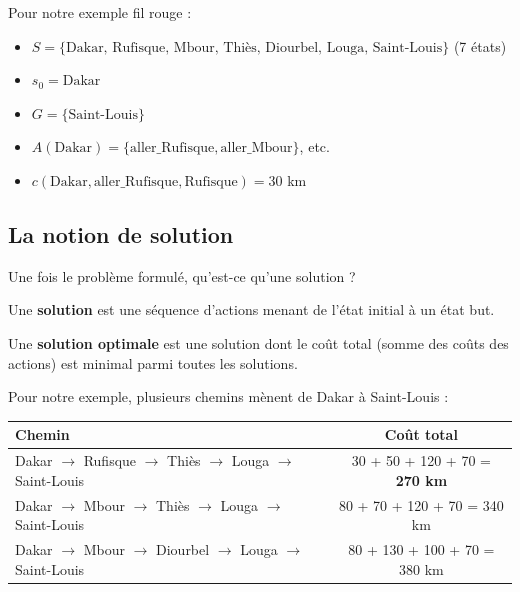 \documentclass[11pt,a4paper]{article}
\begin{document}
\begin{exemplebox}
Pour notre exemple fil rouge :
\begin{itemize}
    \item $S = \{\text{Dakar, Rufisque, Mbour, Thiès, Diourbel, Louga, Saint-Louis}\}$ (7 états)
    \item $s_0 = \text{Dakar}$
    \item $G = \{\text{Saint-Louis}\}$
    \item $A(\text{Dakar}) = \{\text{aller\_Rufisque}, \text{aller\_Mbour}\}$, etc.
    \item $c(\text{Dakar}, \text{aller\_Rufisque}, \text{Rufisque}) = 30$ km
\end{itemize}
\end{exemplebox}

\subsection{La notion de solution}

Une fois le problème formulé, qu'est-ce qu'une solution ?

\begin{definitionbox}
Une \textbf{solution} est une séquence d'actions menant de l'état initial à un état but.

Une \textbf{solution optimale} est une solution dont le coût total (somme des coûts des actions) est minimal parmi toutes les solutions.
\end{definitionbox}

Pour notre exemple, plusieurs chemins mènent de Dakar à Saint-Louis :

\begin{center}
\begin{tabular}{lc}
\toprule
\textbf{Chemin} & \textbf{Coût total} \\
\midrule
Dakar $\rightarrow$ Rufisque $\rightarrow$ Thiès $\rightarrow$ Louga $\rightarrow$ Saint-Louis & 30 + 50 + 120 + 70 = \textbf{270 km} \\
Dakar $\rightarrow$ Mbour $\rightarrow$ Thiès $\rightarrow$ Louga $\rightarrow$ Saint-Louis & 80 + 70 + 120 + 70 = 340 km \\
Dakar $\rightarrow$ Mbour $\rightarrow$ Diourbel $\rightarrow$ Louga $\rightarrow$ Saint-Louis & 80 + 130 + 100 + 70 = 380 km \\
\bottomrule
\end{tabular}
\end{center}
\end{document}
